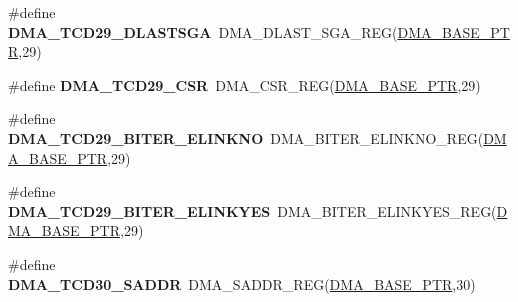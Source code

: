 \begin{DoxyCompactItemize}
\item 
\hypertarget{group___d_m_a___register___accessor___macros_ga570064e13fae09b5a4e8ef20dec6ee46}{}\#define {\bfseries D\+M\+A\+\_\+\+T\+C\+D29\+\_\+\+D\+L\+A\+S\+T\+S\+G\+A}~D\+M\+A\+\_\+\+D\+L\+A\+S\+T\+\_\+\+S\+G\+A\+\_\+\+R\+E\+G(\hyperlink{group___d_m_a___peripheral_ga6997fbc1b1973e9f27170217a3bd6f22}{D\+M\+A\+\_\+\+B\+A\+S\+E\+\_\+\+P\+T\+R},29)\label{group___d_m_a___register___accessor___macros_ga570064e13fae09b5a4e8ef20dec6ee46}

\item 
\hypertarget{group___d_m_a___register___accessor___macros_ga26bbdb7fa020e72dad50f4125574242e}{}\#define {\bfseries D\+M\+A\+\_\+\+T\+C\+D29\+\_\+\+C\+S\+R}~D\+M\+A\+\_\+\+C\+S\+R\+\_\+\+R\+E\+G(\hyperlink{group___d_m_a___peripheral_ga6997fbc1b1973e9f27170217a3bd6f22}{D\+M\+A\+\_\+\+B\+A\+S\+E\+\_\+\+P\+T\+R},29)\label{group___d_m_a___register___accessor___macros_ga26bbdb7fa020e72dad50f4125574242e}

\item 
\hypertarget{group___d_m_a___register___accessor___macros_gaa7b9a2393288f61628cf73737931d64a}{}\#define {\bfseries D\+M\+A\+\_\+\+T\+C\+D29\+\_\+\+B\+I\+T\+E\+R\+\_\+\+E\+L\+I\+N\+K\+N\+O}~D\+M\+A\+\_\+\+B\+I\+T\+E\+R\+\_\+\+E\+L\+I\+N\+K\+N\+O\+\_\+\+R\+E\+G(\hyperlink{group___d_m_a___peripheral_ga6997fbc1b1973e9f27170217a3bd6f22}{D\+M\+A\+\_\+\+B\+A\+S\+E\+\_\+\+P\+T\+R},29)\label{group___d_m_a___register___accessor___macros_gaa7b9a2393288f61628cf73737931d64a}

\item 
\hypertarget{group___d_m_a___register___accessor___macros_ga546d8251096ffecd09d48e7eb5fda080}{}\#define {\bfseries D\+M\+A\+\_\+\+T\+C\+D29\+\_\+\+B\+I\+T\+E\+R\+\_\+\+E\+L\+I\+N\+K\+Y\+E\+S}~D\+M\+A\+\_\+\+B\+I\+T\+E\+R\+\_\+\+E\+L\+I\+N\+K\+Y\+E\+S\+\_\+\+R\+E\+G(\hyperlink{group___d_m_a___peripheral_ga6997fbc1b1973e9f27170217a3bd6f22}{D\+M\+A\+\_\+\+B\+A\+S\+E\+\_\+\+P\+T\+R},29)\label{group___d_m_a___register___accessor___macros_ga546d8251096ffecd09d48e7eb5fda080}

\item 
\hypertarget{group___d_m_a___register___accessor___macros_ga7c534e9e7a3dd26a085ed1eff6fb31dc}{}\#define {\bfseries D\+M\+A\+\_\+\+T\+C\+D30\+\_\+\+S\+A\+D\+D\+R}~D\+M\+A\+\_\+\+S\+A\+D\+D\+R\+\_\+\+R\+E\+G(\hyperlink{group___d_m_a___peripheral_ga6997fbc1b1973e9f27170217a3bd6f22}{D\+M\+A\+\_\+\+B\+A\+S\+E\+\_\+\+P\+T\+R},30)\label{group___d_m_a___register___accessor___macros_ga7c534e9e7a3dd26a085ed1eff6fb31dc}


\end{DoxyCompactItemize}
